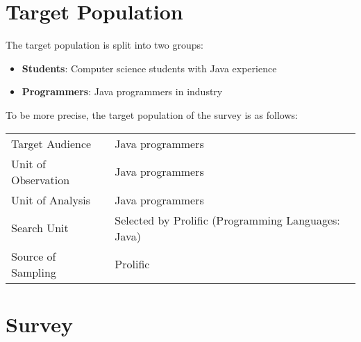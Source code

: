 \documentclass[%
class=scrreprt,
chapterprefix=false,%
open=right,%
twoside=false,%
paper=a4,%
logofile={Logo\_zentral\_farbig\_EN.png},%
thesistype=masterproposal,%
UKenglish,%
]{se2thesis}
\begin{document}
\section{Target Population} \label{target-population}
The target population is split into two groups:
\begin{itemize}
	\item \label{students} \textbf{Students}:
	Computer science students with Java experience
	\item \label{programmers} \textbf{Programmers}: Java programmers in industry
\end{itemize}

To be more precise, the target population of the survey is as follows:
\begin{center}
	\begin{tabular}{|l|l|}
		\hline
		Target Audience      & Java programmers \\
		Unit of Observation  & Java programmers \\
		Unit of Analysis     & Java programmers \\
		Search Unit %
		& Selected by Prolific (Programming Languages: Java)\\
		Source of Sampling   & %
		Prolific \\
		\hline
	\end{tabular}
\end{center}


\section{Survey}
\end{document}
